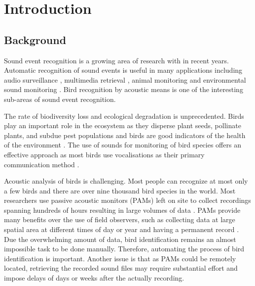 \chapter{Introduction}

\section{Background}



Sound event recognition is a growing area of research with in recent years.
Automatic recognition of sound events is useful in many applications including audio surveillance \cite{Foggia2015}, multimedia retrieval \cite{Wold1996}, animal monitoring \citep{Mcloughlin2019} and environmental sound monitoring \cite{Chu2009}.
Bird recognition by acoustic means is one of the interesting sub-areas of sound event recognition.

The rate of biodiversity loss and ecological degradation is unprecedented. 
Birds play an important role in the ecosystem as they disperse plant seeds, pollinate plants, and subdue pest populations and birds are good indicators of the health of the environment \citep{Priyadarshani2018}.
The use of sounds for monitoring of bird species offers an effective approach as most birds use vocalisations as their primary communication method \cite{Gregory2010}.

Acoustic analysis of birds is challenging. Most people can recognize at most only a few birds and there are over nine thousand bird species in the world.
Most researchers use passive acoustic monitors (PAMs) left on site to collect recordings spanning hundreds of hours resulting in large volumes of data \citep{Sugai2019}. 
PAMs provide many benefits over the use of field observers, such as collecting data at large spatial area at different times of day or year and having a permanent record \cite{Digby2013}.
Due the overwhelming amount of data, bird identification remains an almost impossible task to be done manually.
Therefore, automating the process of bird identification is important.
Another issue is that as PAMs could be remotely located, retrieving the recorded sound files may require substantial effort and impose delays of days or weeks after the actually recording.


